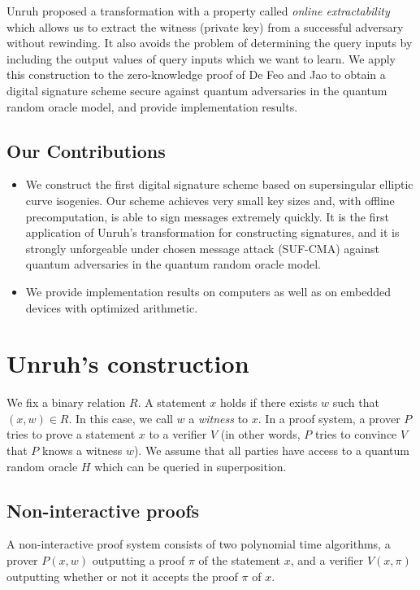 \documentclass[runningheads,a4paper]{llncs}
\begin{document}
Unruh \cite{Unruh15} proposed a transformation with a property called \emph{online extractability} which allows us to extract the witness (private key) from a successful adversary without rewinding. It also avoids the problem of determining the query inputs by including the output values of query inputs which we want to learn. We apply this construction to the zero-knowledge proof of De Feo and Jao to obtain a digital signature scheme secure against quantum adversaries in the quantum random oracle model, and provide implementation results.



\subsection*{Our Contributions}
\begin{itemize}
	\item We construct the first digital signature scheme based on supersingular elliptic curve isogenies. Our scheme achieves very small key sizes and, with offline precomputation, is able to sign messages extremely quickly. It is the first application of Unruh's transformation for constructing signatures, and it is strongly unforgeable under chosen message attack (SUF-CMA) against quantum adversaries in the quantum random oracle model.
	 
	\item We provide implementation results on computers as well as on embedded devices with optimized arithmetic.
\end{itemize}








\section{Unruh's construction}

We fix a binary relation $R$. A statement $x$ holds if there exists $w$ such that $(x,w) \in R$. In this case, we call $w$ a \emph{witness} to $x$. In a proof system, a prover $P$ tries to prove a statement $x$ to a verifier $V$ (in other words, $P$ tries to convince $V$ that $P$ knows a witness $w$). We assume that all parties have access to a quantum random oracle $H$ which can be queried in superposition.

\subsection{Non-interactive proofs}
A non-interactive proof system consists of two polynomial time algorithms, a prover $P(x,w)$ outputting a proof $\pi$ of the statement $x$, and a verifier $V(x,\pi)$ outputting whether or not it accepts the proof $\pi$ of $x$.
\end{document}
